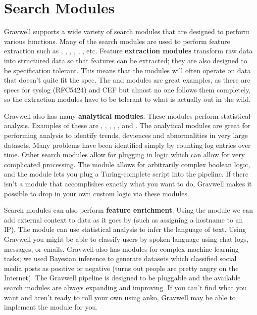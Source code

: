 \section{Search Modules}

Gravwell supports a wide variety of search modules that are designed to
perform various functions. Many of the search modules are used to
perform feature extraction such as , , ,
, , , etc. Feature \textbf{extraction modules}
transform raw data into structured data so that features can be
extracted; they are also designed to be specification tolerant. This
means that the modules will often operate on data that doesn't quite fit
the spec. The  and  modules are great examples, as there
are specs for syslog (RFC5424) and CEF but almost no one follows them
completely, so the extraction modules have to be tolerant to what is
actually out in the wild.

Gravwell also has many \textbf{analytical modules}. These modules perform
statistical analysis. Examples of these are , ,
, , , and . The analytical
modules are great for performing analysis to identify
trends, deviences and abnormalities in very large datasets. Many
problems have been identified simply by counting log entries over time.
Other search modules allow for plugging in logic which can allow for
very complicated processing. The  module allows for arbitrarily
complex boolean logic, and the  module lets you plug a
Turing-complete script into the pipeline. If there isn't a module that
accomplishes exactly what you want to do, Gravwell makes it possible to
drop in your own custom logic via these modules.

Search modules can also perform \textbf{feature enrichment}. Using the
 module we can add external context to data as it goes by
(such as assigning a hostname to an IP). The  module can
use statistical analysis to infer the language of text. Using Gravwell
you might be able to classify users by spoken language using chat logs,
messages, or emails. Gravwell also has modules for complex machine
learning tasks; we used Bayesian inference to generate datasets which
classified social media posts as positive or negative (turns out people
are pretty angry on the Internet). The Gravwell pipeline is designed to
be pluggable and the available search modules are always expanding and
improving. If you can't find what you want and aren't ready to roll
your own using anko, Gravwell may be able to implement the module for you.


